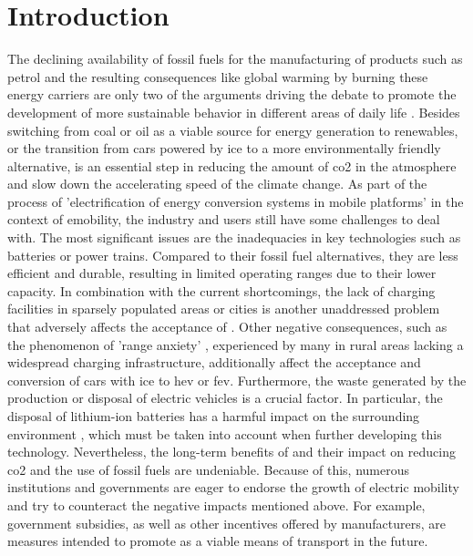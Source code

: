
\chapter{Introduction}
\label{ch:Introduction}

The declining availability of fossil fuels for the manufacturing of products such as petrol and the resulting consequences like global warming by burning these energy carriers are only two of the arguments driving the debate to promote the development of more sustainable behavior in different areas of daily life \cite{kathiresh_e-mobility_2022}.
Besides switching from coal or oil as a viable source for energy generation to renewables, or the transition from cars powered by \acrfull{ice} to a more environmentally friendly alternative, is an essential step in reducing the amount of \acrfull{co2} in the atmosphere and slow down the accelerating speed of the climate change.
As part of the process of 'electrification of energy conversion systems in mobile platforms' \cite[165226]{adib_e-mobility_2019} in the context of \acrfull{emobility}, the industry and users still have some challenges to deal with.
The most significant issues are the inadequacies in key technologies such as batteries or power trains. Compared to their fossil fuel alternatives, they are less efficient and durable, resulting in limited operating ranges due to their lower capacity. 
In combination with the current shortcomings, the lack of charging facilities in sparsely populated areas or cities is another unaddressed problem that adversely affects the acceptance of .
Other negative consequences, such as the phenomenon of 'range anxiety' \cite{rauh_understanding_2015}, experienced by many  in rural areas lacking a widespread charging infrastructure, additionally affect the acceptance and conversion of cars with \acrshort{ice} to \acrfull{hev} or \acrfull{fev}. 
Furthermore, the waste generated by the production or disposal of electric vehicles is a crucial factor. In particular, the disposal of lithium-ion batteries has a harmful impact on the surrounding environment \cite{xu_generation_2017}, which must be taken into account when further developing this technology.
Nevertheless, the long-term benefits of  and their impact on reducing \acrshort{co2} and the use of fossil fuels are undeniable.
Because of this, numerous institutions and governments are eager to endorse the growth of electric mobility and try to counteract the negative impacts mentioned above.
For example, government subsidies, as well as other incentives offered by manufacturers, are measures intended to promote  as a viable means of transport in the future.

